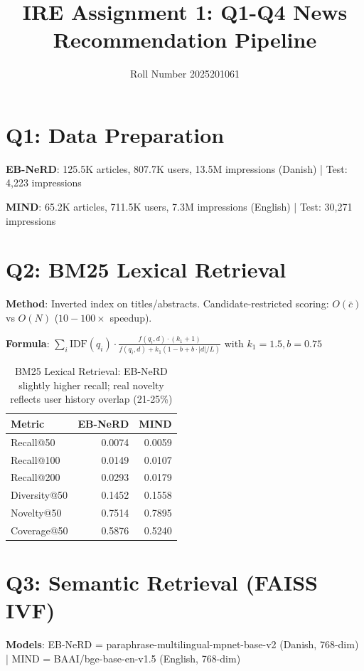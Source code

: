 \documentclass[11pt,a4paper]{article}
\title{\textbf{IRE Assignment 1: Q1-Q4 News Recommendation Pipeline}}
\author{Roll Number 2025201061}
\date{}
\begin{document}
\maketitle

\section*{Q1: Data Preparation}

\textbf{EB-NeRD}: 125.5K articles, 807.7K users, 13.5M impressions (Danish) | Test: 4,223 impressions

\textbf{MIND}: 65.2K articles, 711.5K users, 7.3M impressions (English) | Test: 30,271 impressions

\section*{Q2: BM25 Lexical Retrieval}

\textbf{Method}: Inverted index on titles/abstracts. Candidate-restricted scoring: $O(\bar{c})$ vs $O(N)$ ($10-100\times$ speedup).

\textbf{Formula}: $\sum_{i} \text{IDF}(q_i) \cdot \frac{f(q_i,d) \cdot (k_1+1)}{f(q_i,d) + k_1(1-b+b \cdot |d|/L)}$ with $k_1=1.5, b=0.75$

\begin{table}[H]
\centering\small
\begin{tabular}{lrr}
\toprule
\textbf{Metric} & \textbf{EB-NeRD} & \textbf{MIND} \\
\midrule
Recall@50 & 0.0074 & 0.0059 \\
Recall@100 & 0.0149 & 0.0107 \\
Recall@200 & 0.0293 & 0.0179 \\
Diversity@50 & 0.1452 & 0.1558 \\
Novelty@50 & 0.7514 & 0.7895 \\
Coverage@50 & 0.5876 & 0.5240 \\
\bottomrule
\end{tabular}
\caption{BM25 Lexical Retrieval: EB-NeRD slightly higher recall; real novelty reflects user history overlap (21-25\%)}
\end{table}

\section*{Q3: Semantic Retrieval (FAISS IVF)}

\textbf{Models}: EB-NeRD = paraphrase-multilingual-mpnet-base-v2 (Danish, 768-dim) | MIND = BAAI/bge-base-en-v1.5 (English, 768-dim)
\end{document}
